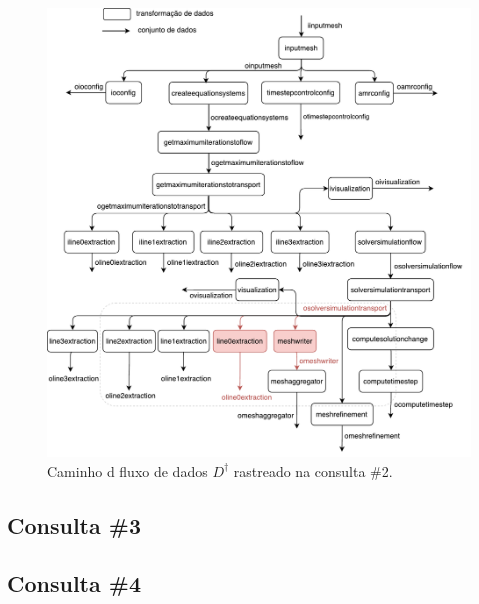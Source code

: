 \begin{figure}[htb]
    \centering
    \includegraphics[width=\textwidth]{img/experiments-dataflow-2}
    \caption[Caminho do fluxo de dados \(D^{\dagger}\) rastreado na consulta \#2]{Caminho d fluxo de dados \(D^{\dagger}\) rastreado na consulta \#2.}%
    \label{fig:experiments-dataflow-2}
\end{figure}

\clearpage

\subsection{Consulta \#3}


\subsection{Consulta \#4}


